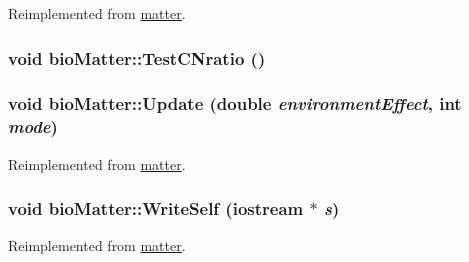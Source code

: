 Reimplemented from \hyperlink{classmatter_a4476cba25191cb4f52471675ae270c04}{matter}.\hypertarget{classbio_matter_ac21201df3eaeb3d52544b1fa0d917143}{
\subsubsection[{TestCNratio}]{\setlength{\rightskip}{0pt plus 5cm}void bioMatter::TestCNratio ()}}
\label{classbio_matter_ac21201df3eaeb3d52544b1fa0d917143}
\hypertarget{classbio_matter_a8ed040ad0f1ef141ae9e5507f33c924a}{
\subsubsection[{Update}]{\setlength{\rightskip}{0pt plus 5cm}void bioMatter::Update (double {\em environmentEffect}, \/  int {\em mode})}}
\label{classbio_matter_a8ed040ad0f1ef141ae9e5507f33c924a}


Reimplemented from \hyperlink{classmatter_a2b3dd492a18a139790bd227e2b4e0a70}{matter}.\hypertarget{classbio_matter_aa8e3723aef3ce483763e621543d4104c}{
\subsubsection[{WriteSelf}]{\setlength{\rightskip}{0pt plus 5cm}void bioMatter::WriteSelf (iostream $\ast$ {\em s})}}
\label{classbio_matter_aa8e3723aef3ce483763e621543d4104c}


Reimplemented from \hyperlink{classmatter_a69825448805e58acc5418362a11eac2b}{matter}.

